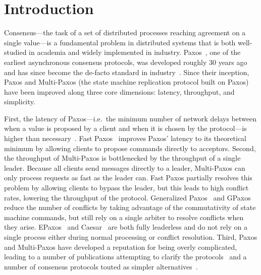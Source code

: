\section{Introduction}
Consensus---the task of a set of distributed processes reaching agreement on a
single value---is a fundamental problem in distributed systems that is both
well-studied in academia and widely implemented in industry.
Paxos~\cite{lamport1998part}, one of the earliest asynchronous consensus
protocols, was developed roughly 30 years ago and has since become the de-facto
standard in industry~\cite{burrows2006chubby, chandra2007paxos,
baker2011megastore, corbett2013spanner}. Since their inception, Paxos and
Multi-Paxos (the state machine replication protocol built on Paxos) have been
improved along three core dimensions: latency, throughput, and simplicity.

First, the latency of Paxos---i.e.\ the minimum number of network delays
between when a value is proposed by a client and when it is chosen by the
protocol---is higher than necessary~\cite{lamport2006lower}. Fast
Paxos~\cite{lamport2006fast} improves Paxos' latency to its theoretical minimum
by allowing clients to propose commands directly to acceptors.
%
Second, the throughput of Multi-Paxos is bottlenecked by the throughput of a
single leader. Because all clients send messages directly to a leader,
Multi-Paxos can only process requests as fast as the leader can. Fast Paxos
partially resolves this problem by allowing clients to bypass the leader, but
this leads to high conflict rates, lowering the throughput of the protocol.
Generalized Paxos~\cite{lamport2005generalized} and GPaxos~\cite{sutra2011fast}
reduce the number of conflicts by taking advantage of the commutativity of
state machine commands, but still rely on a single arbiter to resolve conflicts
when they arise. EPaxos~\cite{moraru2013there, moraru2013proof} and
Caesar~\cite{arun2017speeding} are both fully leaderless and do not rely on a
single process either during normal processing or conflict resolution.
%
Third, Paxos and Multi-Paxos have developed a reputation for being overly
complicated, leading to a number of publications attempting to clarify the
protocols~\cite{lamport2001paxos, lampson2001abcd, mazieres2007paxos,
van2015paxos} and a number of consensus protocols touted as simpler
alternatives~\cite{ongaro2014search, rystsov2018caspaxos}.

